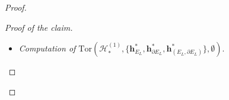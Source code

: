 \documentclass[a4paper]{amsart}
\theoremstyle{plain}
\theoremstyle{definition}
\theoremstyle{remark}
\newcommand{\IR}{{\mathbb R}}
\newcommand{\Tor}[3]{\mathrm{Tor} ({#1}, {#2}, {#3})}
\newcommand{\bbrack}[1]{\lbrack \! \lbrack #1 \rbrack \! \rbrack}
\newcommand{\hbasis}[2][h]{\mathbf{#1}^{#2}}
\newcommand{\hbasisrel}[1]{%
\hbasis{*}_{#1}, \hbasis{*}_{\bord #1}, \hbasis{*}_{(#1, \bord #1)}%
}
\newcommand{\bord}{\partial}
\begin{document}
\begin{proof}
\begin{proof}[Proof of the claim]
\begin{itemize}
  The connecting homomorphism $\delta^{(2)}$ maps $\bbrack{E_L, \bord
    E_L}$ to $\bbrack{T^2_1} + \cdots + \bbrack{T^2_b}$.  Moreover one
  has 
  $$j_*^{(2)}(\bbrack{T^2_{\ell}}) = \bbrack{T^2_{\ell}} \text{ for } \ell
  = 1, \ldots, b-1.$$
    Thus the set $\{\bbrack{T^2_1}, \ldots,
  \bbrack{T^2_{b-1}}\}$ of vectors in $H_2(\bord E_L; \IR)$ can be
  chosen as lifts of the distinguished basis of $H_2(E_L; \IR)$.  As a
  result, the torsion of this short exact sequence
  $\mathcal{H}_*^{(2)}$ is given by the following base change
  determinant:
    \begin{align*}
      \lefteqn{ 
        \Tor{\mathcal{H}^{(2)}_*}{\{\hbasisrel{E_L}\}}{\emptyset}
      } &\\
      &= \left[ 
        \{ \delta(
           \bbrack{E_L, \bord E_L}), 
           \bbrack{T^2_1}, \ldots, \bbrack{T^2_{b-1}}
        \} / 
        \{\bbrack{T^2_1}, \bbrack{T^2_2}, \ldots, \bbrack{T^2_b} \}
        \right] \\
      &= \left|
        \begin{array}{cccc}
          1 & 1 &  & \\
          \vdots & & \ddots & \\
          1 & & & 1 \\
          1 &   &  & 
        \end{array}
        \right| =(-1)^{b-1}.
    \end{align*}

  \item \emph{Computation of
      $\Tor{\mathcal{H}^{(1)}_*}{\{\hbasisrel{E_L}\}}{\emptyset} $}.


\end{itemize}
\end{proof}
\end{proof}
\end{document}
